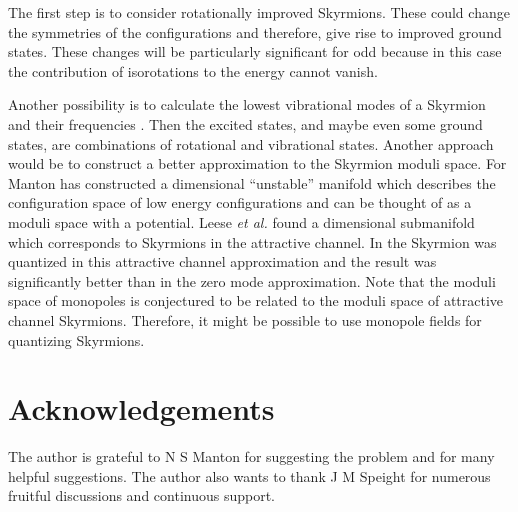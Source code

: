 \documentclass[a4paper,12pt]{article}
\begin{document}
The first step is to consider rotationally improved Skyrmions. These could 
change the symmetries of the configurations and therefore, give rise to 
improved  ground states. These changes will be particularly significant 
for odd \coordHE{} because in this case the contribution of isorotations to the 
energy cannot vanish.

Another possibility is to calculate the lowest vibrational modes of a 
Skyrmion and their frequencies \cite{Barnes:1997nc, Barnes:1997qa, 
Baskerville:1999kk, Baskerville:1999ve, Houghton:1999uq}. 
Then the excited states, and maybe even some ground 
states, are combinations of rotational and vibrational states. Another 
approach would be to construct a better approximation to the Skyrmion 
moduli space. 
For \coordHE{} Manton has constructed a \coordHE{} dimensional 
``unstable'' manifold \cite{Manton:1988ba}
which describes the configuration space of low energy configurations and 
can be thought of as a moduli space with a potential. Leese {\it et al.} 
found a \coordHE{} dimensional submanifold which corresponds to Skyrmions 
in the attractive channel. In \cite{Leese:1995hb} the \coordHE{} Skyrmion was 
quantized in this attractive channel approximation and the result was 
significantly better than in the zero mode approximation.
Note that the moduli space of monopoles is conjectured to be related to 
the moduli space of attractive channel Skyrmions. Therefore, 
it might be possible to use monopole fields for quantizing Skyrmions.

\section*{Acknowledgements}

The author is grateful to N S Manton for suggesting the problem and for 
many helpful suggestions. The author also wants to thank J M Speight for 
numerous fruitful discussions and continuous support.
\end{document}

